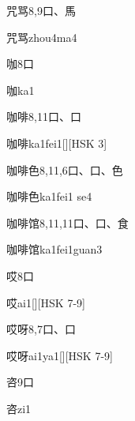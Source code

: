 \begin{Entry}{咒骂}{8,9}{⼝、⾺}
  \begin{Phonetics}{咒骂}{zhou4ma4}
  \end{Phonetics}
\end{Entry}

\begin{Entry}{咖}{8}{⼝}
  \begin{Phonetics}{咖}{ka1}
  \end{Phonetics}
\end{Entry}

\begin{Entry}{咖啡}{8,11}{⼝、⼝}
  \begin{Phonetics}{咖啡}{ka1fei1}[][HSK 3]
  \end{Phonetics}
\end{Entry}

\begin{Entry}{咖啡色}{8,11,6}{⼝、⼝、⾊}
  \begin{Phonetics}{咖啡色}{ka1fei1 se4}
  \end{Phonetics}
\end{Entry}

\begin{Entry}{咖啡馆}{8,11,11}{⼝、⼝、⾷}
  \begin{Phonetics}{咖啡馆}{ka1fei1guan3}
  \end{Phonetics}
\end{Entry}

\begin{Entry}{哎}{8}{⼝}
  \begin{Phonetics}{哎}{ai1}[][HSK 7-9]
  \end{Phonetics}
\end{Entry}

\begin{Entry}{哎呀}{8,7}{⼝、⼝}
  \begin{Phonetics}{哎呀}{ai1ya1}[][HSK 7-9]
  \end{Phonetics}
\end{Entry}

\begin{Entry}{咨}{9}{⼝}
  \begin{Phonetics}{咨}{zi1}
  \end{Phonetics}
\end{Entry}

